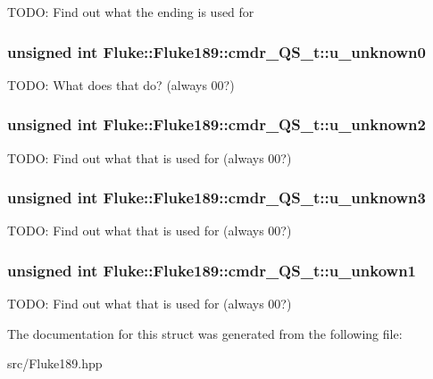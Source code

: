 \label{structFluke_1_1Fluke189_1_1cmdr__QS__t_a08dec92163b6c7a734cdf4aa185d0875}
TODO: Find out what the ending is used for \hypertarget{structFluke_1_1Fluke189_1_1cmdr__QS__t_a944537557b063c776a16a12218d7e8f8}{
\subsubsection[{u\_\-unknown0}]{\setlength{\rightskip}{0pt plus 5cm}unsigned int {\bf Fluke::Fluke189::cmdr\_\-QS\_\-t::u\_\-unknown0}}}
\label{structFluke_1_1Fluke189_1_1cmdr__QS__t_a944537557b063c776a16a12218d7e8f8}
TODO: What does that do? (always 00?) \hypertarget{structFluke_1_1Fluke189_1_1cmdr__QS__t_ada1764cd45a6a8339b44a41d30fbdb86}{
\subsubsection[{u\_\-unknown2}]{\setlength{\rightskip}{0pt plus 5cm}unsigned int {\bf Fluke::Fluke189::cmdr\_\-QS\_\-t::u\_\-unknown2}}}
\label{structFluke_1_1Fluke189_1_1cmdr__QS__t_ada1764cd45a6a8339b44a41d30fbdb86}
TODO: Find out what that is used for (always 00?) \hypertarget{structFluke_1_1Fluke189_1_1cmdr__QS__t_a5df8b378d557e36494d127471e465612}{
\subsubsection[{u\_\-unknown3}]{\setlength{\rightskip}{0pt plus 5cm}unsigned int {\bf Fluke::Fluke189::cmdr\_\-QS\_\-t::u\_\-unknown3}}}
\label{structFluke_1_1Fluke189_1_1cmdr__QS__t_a5df8b378d557e36494d127471e465612}
TODO: Find out what that is used for (always 00?) \hypertarget{structFluke_1_1Fluke189_1_1cmdr__QS__t_a5a7897b4c26236a65ffc6d008b19ce67}{
\subsubsection[{u\_\-unkown1}]{\setlength{\rightskip}{0pt plus 5cm}unsigned int {\bf Fluke::Fluke189::cmdr\_\-QS\_\-t::u\_\-unkown1}}}
\label{structFluke_1_1Fluke189_1_1cmdr__QS__t_a5a7897b4c26236a65ffc6d008b19ce67}
TODO: Find out what that is used for (always 00?) 

The documentation for this struct was generated from the following file:\begin{DoxyCompactItemize}
\item 
src/Fluke189.hpp\end{DoxyCompactItemize}
